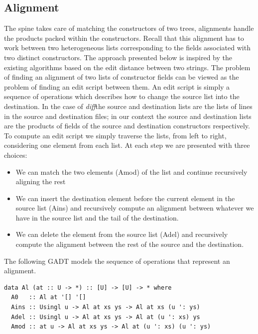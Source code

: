 \documentclass[11pt, titlepage]{article}
\newcommand{\diff}{\emph{diff}}
\begin{document}
\subsection{Alignment}\label{alignment}

The spine takes care of matching
the constructors of two trees, alignments handle the products packed within the constructors.
Recall that this alignment has to work between two heterogeneous lists
corresponding to the fields associated with two distinct constructors.
The approach presented below is inspired by the existing algorithms
based on the edit distance between two strings. The problem of finding
an alignment of two lists of constructor fields can be viewed as the
problem of finding an edit script between them. An edit script is
simply a sequence of operations which describes how to change the source
list into the destination. In the case of \diff the source and destination lists are the lists of lines in the source and destination files; in our context
the source and destination lists are the products of fields of the source and destination constructors respectively. 
To compute an edit script we simply
traverse the lists, from left to right, considering one element from each
list. At each step we are presented with three choices:

\begin{itemize}
\item
  We can match the two elements (Amod) of the list and continue
  recursively aligning the rest
\item
  We can insert the destination element before the current element in
  the source list (Ains) and recursively compute an alignment between
  whatever we have in the source list and the tail of the destination.
\item
  We can delete the element from the source list (Adel) and recursively
  compute the alignment between the rest of the source and the
  destination.
\end{itemize}


The following GADT models the sequence of operations that represent an 
alignment.

\begin{verbatim}
data Al (at :: U -> *) :: [U] -> [U] -> * where
  A0   :: Al at '[] '[]
  Ains :: Usingl u -> Al at xs ys -> Al at xs (u ': ys)
  Adel :: Usingl u -> Al at xs ys -> Al at (u ': xs) ys
  Amod :: at u -> Al at xs ys -> Al at (u ': xs) (u ': ys)
\end{verbatim}
\end{document}
